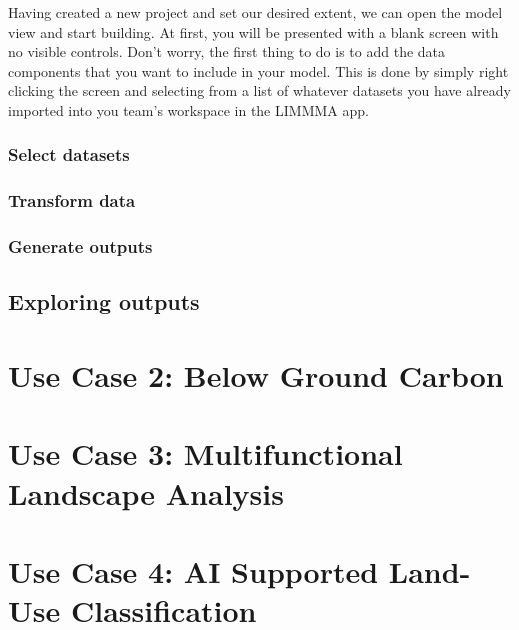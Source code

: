 \documentclass[
  letterpaper,
  DIV=11,
  numbers=noendperiod]{scrreprt}
\begin{document}
Having created a new project and set our desired extent, we can open the
model view and start building. At first, you will be presented with a
blank screen with no visible controls. Don't worry, the first thing to
do is to add the data components that you want to include in your model.
This is done by simply right clicking the screen and selecting from a
list of whatever datasets you have already imported into you team's
workspace in the LIMMMA app.

\subsection{Select datasets}\label{select-datasets}

\subsection{Transform data}\label{transform-data}

\subsection{Generate outputs}\label{generate-outputs}

\section{Exploring outputs}\label{exploring-outputs}


\chapter{Use Case 2: Below Ground
Carbon}\label{use-case-2-below-ground-carbon}


\chapter{Use Case 3: Multifunctional Landscape
Analysis}\label{use-case-3-multifunctional-landscape-analysis}


\chapter{Use Case 4: AI Supported Land-Use
Classification}\label{use-case-4-ai-supported-land-use-classification}
\end{document}
